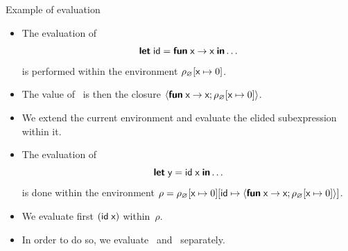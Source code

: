%
\begin{frame}{Example of evaluation}

  \begin{itemize}

    \item The evaluation of
      {\setlength{\abovedisplayskip}{2pt}
       \setlength{\belowdisplayskip}{2pt}
      \begin{equation*}
        \textsf{\textbf{let}}\; \textsf{id} = \textsf{\textbf{fun}}\; \textsf{x} \rightarrow \textsf{x} \;\textsf{\textbf{in}} \ldots
      \end{equation*}}
      is performed within the environment
      $\rho_\varnothing[\textsf{x} \mapsto 0]$.

    \item The value of~ is then the closure
      $\langle \textsf{\textbf{fun}} \; \textsf{x} \rightarrow \textsf{x}; \rho_\varnothing[\textsf{x} \mapsto 0] \rangle$.

    \item We extend the current environment and evaluate the elided
      subexpression within it.

  \item The evaluation of
      {\setlength{\abovedisplayskip}{2pt}
       \setlength{\belowdisplayskip}{2pt}
      \begin{equation*}
        \textsf{\textbf{let}}\; \textsf{y} = \textsf{id} \; \textsf{x} \; \textsf{\textbf{in}} \ldots
      \end{equation*}}
      is done within the environment $\rho =
\rho_\varnothing[\textsf{x} \mapsto 0][\textsf{id} \mapsto \langle \textsf{\textbf{fun}} \; \textsf{x} \rightarrow \textsf{x}; \rho_\varnothing[\textsf{x} \mapsto 0] \rangle]$.

    \item We evaluate first $(\textsf{id} \; \textsf{x})$ within~\(\rho\).

    \item In order to do so, we evaluate~ and~
      separately.

  \end{itemize}

\end{frame}

